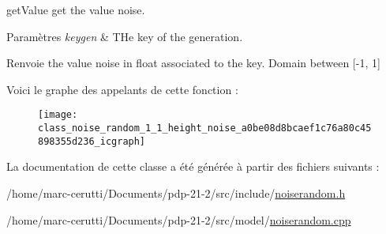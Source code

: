 get\+Value get the value noise. 


\begin{DoxyParams}{Paramètres}
{\em keygen} & T\+He key of the generation. \\
\hline
\end{DoxyParams}
\begin{DoxyReturn}{Renvoie}
the value noise in float associated to the key. Domain between \mbox{[}-\/1, 1\mbox{]} 
\end{DoxyReturn}
Voici le graphe des appelants de cette fonction \+:\nopagebreak
\begin{figure}[H]
\begin{center}
\leavevmode
\texttt{[image: class\_noise\_random\_1\_1\_height\_noise\_a0be08d8bcaef1c76a80c45898355d236\_icgraph]}
\end{center}
\end{figure}


La documentation de cette classe a été générée à partir des fichiers suivants \+:\begin{DoxyCompactItemize}
\item 
/home/marc-\/cerutti/\+Documents/pdp-\/21-\/2/src/include/\hyperlink{noiserandom_8h}{noiserandom.\+h}\item 
/home/marc-\/cerutti/\+Documents/pdp-\/21-\/2/src/model/\hyperlink{noiserandom_8cpp}{noiserandom.\+cpp}\end{DoxyCompactItemize}
